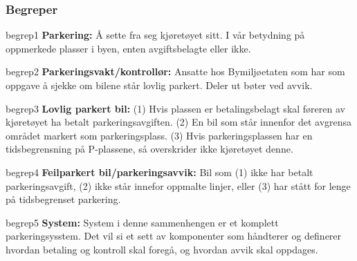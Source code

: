 \documentclass[xetex]{beamer}
\begin{document}
\begin{frame}\label{fr:begreper}
	\frametitle{Begreper}
	
	\vspace{1em}
	
	\begin{beamercolorbox}[wd=0.60\textwidth, ht=5.5ex, dp=5pt, leftskip=.3cm, rightskip=.3cm]{begrep1}
		\tiny
		\textbf{Parkering:} Å sette fra seg kjøretøyet sitt. I vår betydning på oppmerkede plasser i byen, enten avgiftsbelagte eller ikke.
	\end{beamercolorbox}
	
	\vspace{-1em}
	
	\hfill\begin{beamercolorbox}[wd=0.70\textwidth, ht=5.5ex, dp=5pt, leftskip=.3cm, rightskip=.3cm]{begrep2}
		\tiny
		\textbf{Parkeringsvakt/kontrollør:} Ansatte hos Bymiljøetaten som har som oppgave å sjekke om bilene står lovlig parkert. Deler ut bøter ved avvik.
	\end{beamercolorbox}
	
	\begin{beamercolorbox}[wd=0.90\textwidth, ht=10ex, dp=5pt, leftskip=.3cm, rightskip=.3cm]{begrep3}
		\tiny
		\textbf{Lovlig parkert bil:}  (1) Hvis plassen er betalingsbelagt skal føreren av kjøretøyet ha betalt parkeringsavgiften. (2) En bil som står innenfor det avgrensa området markert som parkeringsplass. (3) Hvis parkeringsplassen har en tidsbegrensning på P-plassene, så overskrider ikke kjøretøyet denne.
	\end{beamercolorbox}
	
	\vspace{-1em}
	
	\hfill\begin{beamercolorbox}[wd=0.7\textwidth, ht=7.3ex, dp=5pt, leftskip=.3cm, rightskip=.3cm]{begrep4}
		\tiny
		\textbf{Feilparkert bil/parkeringsavvik:} Bil som (1) ikke har betalt parkeringsavgift, (2) ikke står innefor oppmalte linjer, eller (3) har stått for lenge på tidsbegrenset parkering.
	\end{beamercolorbox}
	
	\begin{beamercolorbox}[wd=0.80\textwidth, ht=7.3ex, dp=5pt, leftskip=.3cm, rightskip=.3cm]{begrep5}
		\tiny
		\textbf{System:} System i denne sammenhengen er et komplett parkeringsysstem. Det vil si et sett av komponenter som håndterer og definerer hvordan betaling og kontroll skal foregå, og hvordan avvik skal oppdages. 
	\end{beamercolorbox}
	

\end{frame}
\end{document}
